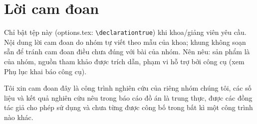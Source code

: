 \chapter*{Lời cam đoan}
\begin{huongdan}
Chỉ bật tệp này (options.tex: \texttt{\textbackslash declarationtrue}) khi khoa/giảng viên yêu cầu.
Nội dung lời cam đoan do nhóm tự viết theo mẫu của khoa; khung không soạn sẵn để tránh cam đoan
điều chưa đúng với bài của nhóm. Nên nêu: sản phẩm là của nhóm, nguồn tham khảo được trích dẫn,
phạm vi hỗ trợ bởi công cụ (xem Phụ lục khai báo công cụ).
\end{huongdan}

Tôi xin cam đoan đây là công trình nghiên cứu của riêng nhóm chúng tôi, các số liệu và kết quả nghiên cứu nêu trong báo cáo đồ án là trung thực, được các đồng tác giả cho phép sử dụng và chưa từng được công bố trong bất kì một công trình nào khác.
